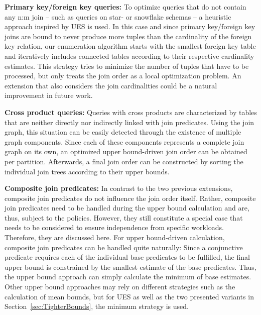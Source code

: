 \begin{compactitem}
    \item[\textbf{Primary key/foreign key queries:}] To optimize queries that do not contain any n:m join -- such as queries on star- or snowflake schemas -- a heuristic approach inspired by UES is used. In this case and since primary key/foreign key joins are bound to never produce more tuples than the cardinality of the foreign key relation, our enumeration algorithm starts with the smallest foreign key table and iteratively includes connected tables according to their respective cardinality estimates. This strategy tries to minimize the number of tuples that have to be processed, but only treats the join order as a local optimization problem. An extension that also considers the join cardinalities could be a natural improvement in future work.
    \item[\textbf{Cross product queries:}] Queries with cross products are characterized by tables that are neither directly nor indirectly linked with join predicates. Using the join graph, this situation can be easily detected through the existence of multiple graph components. Since each of these components represents a complete join graph on its own, an optimized upper bound-driven join order can be obtained per partition. Afterwards, a final join order can be constructed by sorting the individual join trees according to their upper bounds.
    \item[\textbf{Composite join predicates:}] In contrast to the two previous extensions, composite join predicates do not influence the join order itself. Rather, composite join predicates need to be handled during the upper bound calculation and are, thus, subject to the policies. However, they still constitute a special case that needs to be considered to ensure independence from specific workloads. Therefore, they are discussed here. For upper bound-driven calculation, composite join predicates can be handled quite naturally: Since a conjunctive predicate requires each of the individual base predicates to be fulfilled, the final upper bound is constrained by the smallest estimate of the base predicates. Thus, the upper bound approach can simply calculate the minimum of base estimates. Other upper bound approaches may rely on different strategies such as the calculation of mean bounds, but for UES as well as the two presented variants in Section~\ref{sec:TighterBounds}, the minimum strategy is used.
\end{compactitem}

